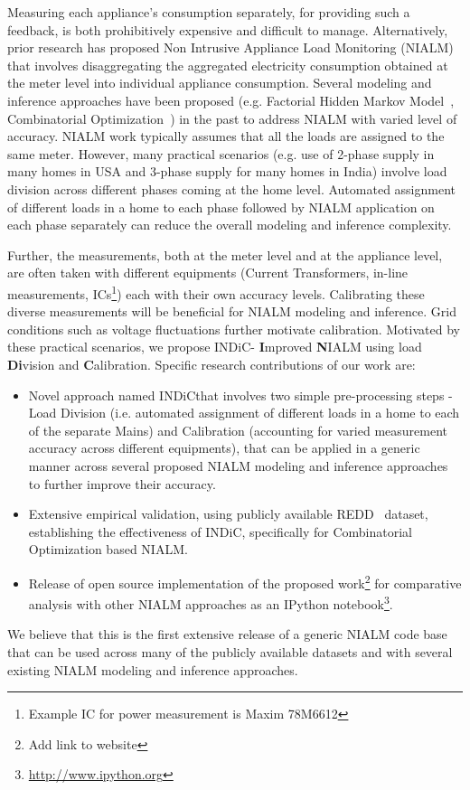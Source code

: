 \documentclass[conference]{IEEEtran}
\newcommand{\indic}{INDiC}
\newcommand{\indicns}{INDiC}
\begin{document}
\noindent Measuring each appliance's consumption separately, for providing such a feedback, is both prohibitively expensive and difficult to manage. Alternatively, prior research has proposed Non Intrusive Appliance Load Monitoring (NIALM) that involves disaggregating the aggregated electricity consumption obtained at the meter level into individual appliance consumption. Several modeling and inference approaches have been proposed (e.g. Factorial Hidden Markov Model~\cite{Ghahramani_97a}, Combinatorial Optimization~\cite{hart}) in the past to address NIALM with varied level of accuracy. NIALM work typically assumes that all the loads are assigned to the same meter. However, many practical scenarios (e.g. use of 2-phase supply in many homes in USA and 3-phase supply for many homes in India) involve load division across different phases coming at the home level. Automated assignment of different loads in a home to each phase followed by NIALM application on each phase separately can reduce the overall modeling and inference complexity. 

\noindent Further, the measurements, both at the meter level and at the appliance level, are often taken with different equipments (Current Transformers, in-line measurements, ICs\footnote{Example IC for power measurement is Maxim 78M6612}) each with their own accuracy levels. Calibrating these diverse measurements will be beneficial for NIALM modeling and inference. Grid conditions such as voltage fluctuations further motivate calibration. Motivated by these practical scenarios, we propose \indic - \textbf{I}mproved \textbf{N}IALM using load \textbf{Di}vision and \textbf{C}alibration. Specific research contributions of our work are:
\begin{itemize}
\item Novel approach named \indic that involves two simple pre-processing steps - Load Division (i.e. automated assignment of different loads in a home to each of the separate Mains) and Calibration (accounting for varied measurement accuracy across different equipments), that can be applied in a generic manner across several proposed NIALM modeling and inference approaches to further improve their accuracy. 
\item Extensive empirical validation, using publicly available REDD~\cite{redd} dataset, establishing the effectiveness of \indicns, specifically for Combinatorial Optimization based NIALM. 
\item Release of open source implementation of the proposed work\footnote{Add link to website} for comparative analysis with other NIALM approaches as an IPython notebook\footnote{\url{http://www.ipython.org}}. 
\end{itemize}
\noindent We believe that this is the first extensive release of a generic NIALM code base that can be used across many of the publicly available datasets and with several existing NIALM modeling and inference approaches.
\end{document}
